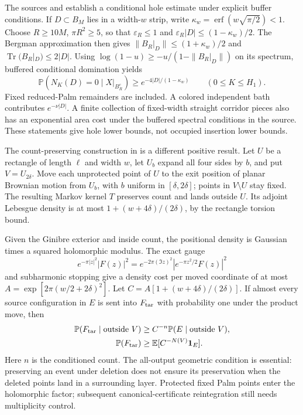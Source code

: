\documentclass[11pt,a4paper]{article}
\theoremstyle{definition}
\theoremstyle{remark}
\numberwithin{equation}{section}
\DeclareMathOperator{\Tr}{Tr}
\begin{document}
The sources 
and  establish a
conditional hole estimate under explicit buffer conditions.
If $D\subset B_M$ lies in a width-$w$ strip, write
$\kappa_w=\operatorname{erf}(w\sqrt{\pi/2})<1$.
Choose $R\ge10M$, $\pi R^2\ge5$, so that
$\varepsilon_R\le1$ and
$\varepsilon_R|D|\le(1-\kappa_w)/2$.
The Bergman approximation then gives
$\|B_R|_D\|\le(1+\kappa_w)/2$ and $\Tr(B_R|_D)\le2|D|$.
Using $\log(1-u)\ge-u/(1-\|B_R|_D\|)$ on its spectrum,
buffered conditional domination yields
\begin{equation}\label{br:corridor-hole}
 \mathbb P(N_K(D)=0\mid X|_{B_R^c})
       \ge e^{-4|D|/(1-\kappa_w)}
       \qquad(0\le K\le H_1).
\end{equation}
Fixed reduced-Palm remainders are included. A colored independent
bath contributes $e^{-\nu|D|}$. A finite collection of fixed-width
straight corridor pieces also has an exponential area cost under
the buffered spectral conditions in the source. These statements
give hole lower bounds, not occupied insertion lower bounds.

The count-preserving construction in
 is a different positive
result. Let $U$ be a rectangle of length $\ell$ and width $w$,
let $U_b$ expand all four sides by $b$, and put $V=U_{2\delta}$.
Move each unprotected point of $U$ to the exit position of planar
Brownian motion from $U_b$, with $b$ uniform in $[\delta,2\delta]$;
points in $V\setminus U$ stay fixed. The resulting Markov kernel
$T$ preserves count and lands outside $U$.
Its adjoint Lebesgue density is at most
$1+(w+4\delta)/(2\delta)$, by the rectangle torsion bound.

Given the Ginibre exterior and inside count, the positional density
is Gaussian times a squared holomorphic modulus. The exact gauge
\[
 e^{-\pi|z|^2}|F(z)|^2
       =e^{-2\pi(\Im z)^2}|e^{-\pi z^2/2}F(z)|^2
\]
and subharmonic stopping give a density cost per moved coordinate
of at most $A=\exp[2\pi(w/2+2\delta)^2]$.
Let
$C=A[1+(w+4\delta)/(2\delta)]$.
If almost every source configuration in $E$ is sent into
$F_{\rm tar}$ with probability one under the product move, then
\begin{align}
 \mathbb P(F_{\rm tar}\mid\mathrm{outside}\ V)
   &\ge C^{-n}\mathbb P(E\mid\mathrm{outside}\ V),\label{br:clearing-count}\\
 \mathbb P(F_{\rm tar})
   &\ge\mathbb E[C^{-N(V)}\mathbf1_E].\label{br:clearing-integrated}
\end{align}
Here $n$ is the conditioned count. The all-output geometric condition
is essential: preserving an event under deletion does not ensure its
preservation when the deleted points land in a surrounding layer.
Protected fixed Palm points enter the holomorphic factor; subsequent
canonical-certificate reintegration still needs multiplicity control.
\end{document}
